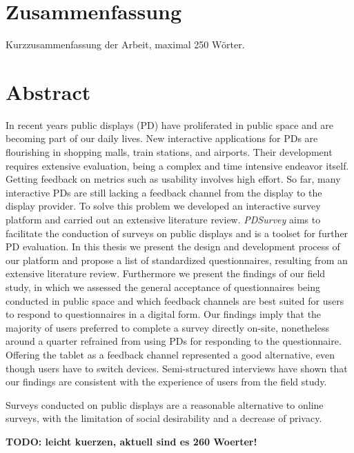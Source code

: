 
\section*{Zusammenfassung}

	Kurzzusammenfassung der Arbeit, maximal 250 W\"orter.

\section*{Abstract}

	In recent years public displays (PD) have proliferated in public space and are becoming part of our daily lives. New interactive applications for PDs are flourishing in shopping malls, train stations, and airports. Their development requires extensive evaluation, being a complex and time intensive endeavor itself. Getting feedback on metrics such as usability involves high effort. So far, many interactive PDs are still lacking a feedback channel from the display to the display provider. To solve this problem we developed an interactive survey platform and carried out an extensive literature review.
	\textit{PDSurvey} aims to facilitate the conduction of surveys on public displays and is a toolset for further PD evaluation. In this thesis we present the design and development process of our platform and propose a list of standardized questionnaires, resulting from an extensive literature review. Furthermore we present the findings of our field study, in which we assessed the general acceptance of questionnaires being conducted in public space and which feedback channels are best suited for users to respond to questionnaires in a digital form.
	Our findings imply that the majority of users preferred to complete a survey directly on-site, nonetheless around a quarter refrained from using PDs for responding to the questionnaire. Offering the tablet as a feedback channel represented a good alternative, even though users have to switch devices. Semi-structured interviews have shown that our findings are consistent with the experience of users from the field study.

	Surveys conducted on public displays are a reasonable alternative to online surveys, with the limitation of social desirability and a decrease of privacy.

	\textbf{TODO: leicht kuerzen, aktuell sind es 260 Woerter!}
	

